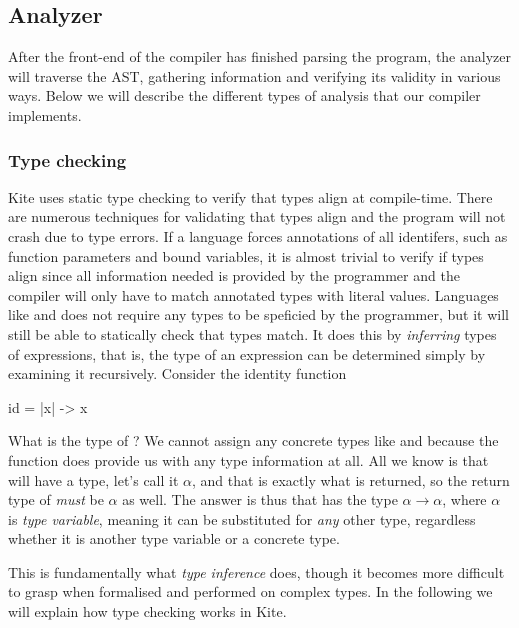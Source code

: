 \subsection{Analyzer}
After the front-end of the compiler has finished parsing the program, the analyzer will traverse the AST, gathering information and verifying its validity in various ways. Below we will describe the different types of analysis that our compiler implements.

\subsubsection{Type checking}
Kite uses static type checking to verify that types align at compile-time. There are numerous techniques for validating that types align and the program will not crash due to type errors. If a language forces annotations of all identifers, such as function parameters and bound variables, it is almost trivial to verify if types align since all information needed is provided by the programmer and the compiler will only have to match annotated types with literal values. Languages like  and  does not require any types to be speficied by the programmer, but it will still be able to statically check that types match. It does this by \emph{inferring} types of expressions, that is, the type of an expression can be determined simply by examining it recursively. Consider the identity function

\begin{kite}
id = |x| -> { x }
\end{kite}

What is the type of ? We cannot assign any concrete types like  and  because the function does provide us with any type information at all. All we know is that  will have a type, let's call it $\alpha$, and that  is exactly what is returned, so the return type of  \emph{must} be $\alpha$ as well. The answer is thus that  has the type $\alpha \to \alpha$, where $\alpha$ is \emph{type variable}, meaning it can be substituted for \emph{any} other type, regardless whether it is another type variable or a concrete type.

This is fundamentally what \emph{type inference} does, though it becomes more difficult to grasp when formalised and performed on complex types. In the following we will explain how type checking works in Kite.

